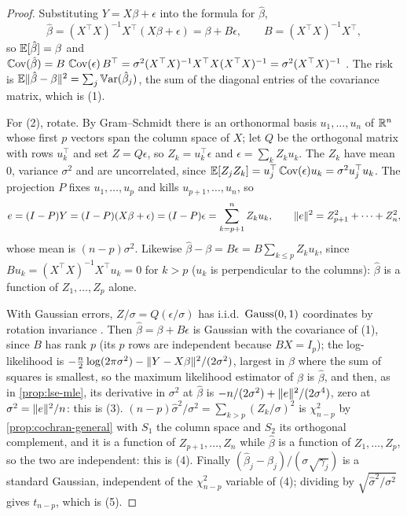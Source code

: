 \begin{proof}
Substituting $Y = X\beta + \epsilon$ into the formula for $\hat{\beta}$,
\[
\hat{\beta} = (X^\top X)^{-1}X^\top(X\beta + \epsilon) = \beta + B\epsilon, \qquad B = (X^\top X)^{-1}X^\top,
\]
so $\operatorname*{\mathbb{E}}[\hat{\beta}] = \beta$ and $\operatorname*{\mathbb{C}\text{ov}}(\hat{\beta}) = B\,\operatorname*{\mathbb{C}\text{ov}}(\epsilon)\,B^\top = \sigma^2(X^\top X)^{-1}X^\top X(X^\top X)^{-1} = \sigma^2(X^\top X)^{-1}$ .
The risk is $\operatorname*{\mathbb{E}}\lVert\hat{\beta} - \beta\rVert^2 = \sum_j \operatorname*{\mathbb{V}\text{ar}}(\hat{\beta}_j)$, the sum of the diagonal entries of the covariance matrix, which is (1).

For (2), rotate.
By Gram--Schmidt  there is an orthonormal basis $u_1, \ldots, u_n$ of $\mathbb{R}^n$ whose first $p$ vectors span the column space of $X$; let $Q$ be the orthogonal matrix with rows $u_k^\top$ and set $Z = Q\epsilon$, so $Z_k = u_k^\top\epsilon$ and $\epsilon = \sum_k Z_ku_k$.
The $Z_k$ have mean $0$, variance $\sigma^2$ and are uncorrelated, since $\operatorname*{\mathbb{E}}[Z_jZ_k] = u_j^\top\operatorname*{\mathbb{C}\text{ov}}(\epsilon)u_k = \sigma^2u_j^\top u_k$.
The projection $P$ fixes $u_1, \ldots, u_p$ and kills $u_{p+1}, \ldots, u_n$, so
\[
e = (I - P)Y = (I - P)(X\beta + \epsilon) = (I - P)\epsilon = \sum_{k=p+1}^n Z_ku_k, \qquad \lVert e\rVert^2 = Z_{p+1}^2 + \cdots + Z_n^2,
\]
whose mean is $(n - p)\sigma^2$.
Likewise $\hat{\beta} - \beta = B\epsilon = B\sum_{k \leq p} Z_ku_k$, since $Bu_k = (X^\top X)^{-1}X^\top u_k = 0$ for $k > p$ ($u_k$ is perpendicular to the columns): $\hat{\beta}$ is a function of $Z_1, \ldots, Z_p$ alone.

With Gaussian errors, $Z/\sigma = Q(\epsilon/\sigma)$ has i.i.d.\ $\text{Gauss}(0, 1)$ coordinates by rotation invariance .
Then $\hat{\beta} = \beta + B\epsilon$ is Gaussian with the covariance of (1), since $B$ has rank $p$ (its $p$ rows are independent because $BX = I_p$); the log-likelihood is $-\frac{n}{2}\log(2\pi\sigma^2) - \lVert Y - X\beta\rVert^2/(2\sigma^2)$, largest in $\beta$ where the sum of squares is smallest, so the maximum likelihood estimator of $\beta$ is $\hat{\beta}$, and then, as in \cref{prop:lse-mle}, its derivative in $\sigma^2$ at $\hat{\beta}$ is $-n/(2\sigma^2) + \lVert e\rVert^2/(2\sigma^4)$, zero at $\sigma^2 = \lVert e\rVert^2/n$: this is (3).
$(n - p)\hat{\sigma}^2/\sigma^2 = \sum_{k > p}(Z_k/\sigma)^2$ is $\chi^2_{n-p}$ by \cref{prop:cochran-general} with $S_1$ the column space and $S_2$ its orthogonal complement, and it is a function of $Z_{p+1}, \ldots, Z_n$ while $\hat{\beta}$ is a function of $Z_1, \ldots, Z_p$, so the two are independent: this is (4).
Finally $(\hat{\beta}_j - \beta_j)/(\sigma\sqrt{\gamma_j})$ is a standard Gaussian, independent of the $\chi^2_{n-p}$ variable of (4); dividing by $\sqrt{\hat{\sigma}^2/\sigma^2}$ gives $t_{n-p}$, which is (5).
\end{proof}

